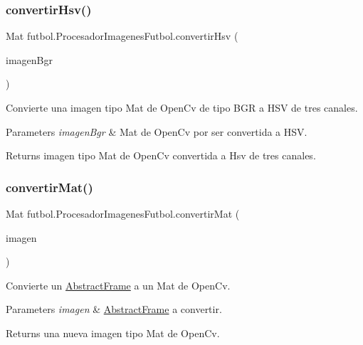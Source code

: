 \subsubsection{\texorpdfstring{convertir\+Hsv()}{convertirHsv()}}
{\footnotesize\ttfamily Mat futbol.\+Procesador\+Imagenes\+Futbol.\+convertir\+Hsv (\begin{DoxyParamCaption}\item[{Mat}]{imagen\+Bgr }\end{DoxyParamCaption})\hspace{0.3cm}{\ttfamily [private]}}

Convierte una imagen tipo Mat de Open\+Cv de tipo B\+GR a H\+SV de tres canales. 
\begin{DoxyParams}{Parameters}
{\em imagen\+Bgr} & Mat de Open\+Cv por ser convertida a H\+SV. \\
\hline
\end{DoxyParams}
\begin{DoxyReturn}{Returns}
imagen tipo Mat de Open\+Cv convertida a Hsv de tres canales. 
\end{DoxyReturn}
\hypertarget{classfutbol_1_1_procesador_imagenes_futbol_ac939fa4525257d9d737c0cc5804b9d17}{}\label{classfutbol_1_1_procesador_imagenes_futbol_ac939fa4525257d9d737c0cc5804b9d17} 
\subsubsection{\texorpdfstring{convertir\+Mat()}{convertirMat()}}
{\footnotesize\ttfamily Mat futbol.\+Procesador\+Imagenes\+Futbol.\+convertir\+Mat (\begin{DoxyParamCaption}\item[{\hyperlink{classfutbol_1_1_abstract_frame}{Abstract\+Frame}}]{imagen }\end{DoxyParamCaption})\hspace{0.3cm}{\ttfamily [private]}}

Convierte un \hyperlink{classfutbol_1_1_abstract_frame}{Abstract\+Frame} a un Mat de Open\+Cv. 
\begin{DoxyParams}{Parameters}
{\em imagen} & \hyperlink{classfutbol_1_1_abstract_frame}{Abstract\+Frame} a convertir. \\
\hline
\end{DoxyParams}
\begin{DoxyReturn}{Returns}
una nueva imagen tipo Mat de Open\+Cv. 
\end{DoxyReturn}
\hypertarget{classfutbol_1_1_procesador_imagenes_futbol_a1178964c980b9d344aae2674f3d39e27}{}\label{classfutbol_1_1_procesador_imagenes_futbol_a1178964c980b9d344aae2674f3d39e27} 
